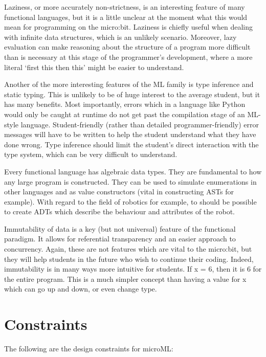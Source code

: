 \documentclass[12pt, a4paper]{report}
\begin{document}
Laziness, or more accurately non-strictness,  is an interesting feature of many functional languages, 
but it is a little unclear at the moment what this would mean for programming on the micro:bit. 
Laziness is chiefly useful when dealing with infinite data structures, which is an unlikely
scenario. Moreover, lazy evaluation can make reasoning about the structure of a program more
difficult than is necessary at this stage of the programmer's development, where a more literal
`first this then this' might be easier to understand. 

Another of the more interesting features of the ML family is type inference and static typing. This
is unlikely to be of huge interest to the average student, but it has many benefits. Most
importantly, errors which in a language like Python would only be caught at runtime do not get past
the compilation stage of an ML-style language. Student-friendly (rather than detailed
programmer-friendly) error messages will have to be
written to help the student understand what they have done wrong. Type inference should limit the
student's direct interaction with the type system, which can be very difficult to understand.

Every functional language has algebraic data types. They are fundamental to how any large program is
constructed. They can be used to simulate enumerations in other languages and as value constructors
(vital in constructing ASTs for example). With regard to the field of robotics for example, to
should be possible to create ADTs which describe the behaviour and attributes of the robot.

Immutability of data is a key (but not universal) feature of the functional paradigm. It allows for
referential transparency and an easier approach to concurrency. Again, these are not features which
are vital to the micro:bit, but they will help students in the future who wish to continue their
coding. Indeed, immutability is in many ways more intuitive for students. If x = 6, then it is 6 for
the entire program. This is a much simpler concept than having a value for x which can go up and down,
or even change type.

\section{Constraints}
The following are the design constraints for microML:
\end{document}
